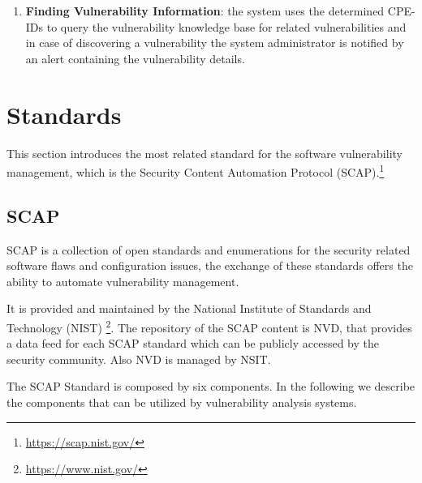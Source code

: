 \documentclass{llncs}
\begin{document}
\begin{enumerate}
   \item \textbf{Finding Vulnerability Information}: the system uses the determined CPE-IDs to query the vulnerability knowledge base for related vulnerabilities and in case of discovering a vulnerability  the system administrator is notified by an alert containing the vulnerability details.      
   
 
 \end{enumerate}

\section{Standards}
This section introduces the most related standard for the software vulnerability management, which is the Security Content Automation Protocol (SCAP).\footnote{\url{https://scap.nist.gov/}}


\subsection{SCAP}

\par SCAP is a collection of open standards and enumerations for the security related software flaws and configuration issues, the exchange of these standards offers the ability to automate vulnerability management\cite{scap_doc}. \par   
 It is provided and maintained by the National Institute of Standards and Technology (NIST) \footnote{\url{https://www.nist.gov/}}. The repository of the SCAP content is NVD, that provides a data feed for each SCAP standard which can be publicly accessed by the security community. Also NVD is managed by NSIT.
 
 The SCAP Standard is composed by six components. In the following we describe the components that can be utilized by vulnerability analysis systems.
 
\end{document}
